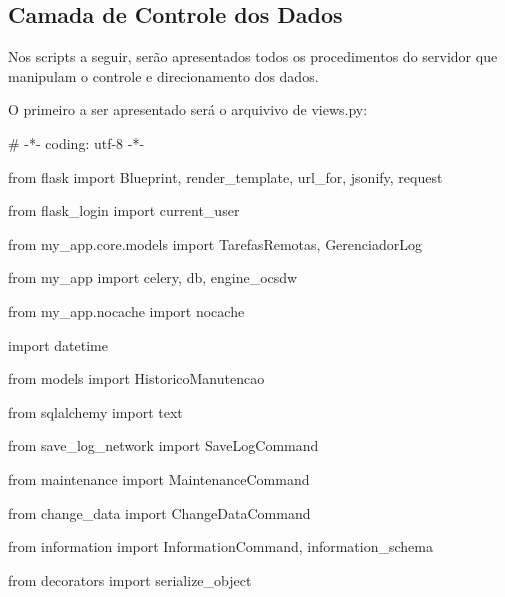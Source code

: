    \bigskip


    \bigskip

    \subsection{Camada de Controle dos Dados}
{\color{black}
    Nos scripts a seguir, ser\~ao apresentados todos os procedimentos do servidor que manipulam o controle e direcionamento
        dos dados.}

{\color{black}
    O primeiro a ser apresentado ser\'a o arquivivo de views.py:}

{\ttfamily\color[rgb]{0.10980392,0.10980392,0.10980392}
    \# -*- coding: utf-8 -*-}


    \bigskip

{\ttfamily\color[rgb]{0.10980392,0.10980392,0.10980392}
    from flask import Blueprint, render\_template, url\_for, jsonify, request}

{\ttfamily\color[rgb]{0.10980392,0.10980392,0.10980392}
    from flask\_login import current\_user}

{\ttfamily\color[rgb]{0.10980392,0.10980392,0.10980392}
    from my\_app.core.models import TarefasRemotas, GerenciadorLog}

{\ttfamily\color[rgb]{0.10980392,0.10980392,0.10980392}
    from my\_app import celery, db, engine\_ocsdw}

{\ttfamily\color[rgb]{0.10980392,0.10980392,0.10980392}
    from my\_app.nocache import nocache}

{\ttfamily\color[rgb]{0.10980392,0.10980392,0.10980392}
    import datetime}

{\ttfamily\color[rgb]{0.10980392,0.10980392,0.10980392}
    from models import HistoricoManutencao}

{\ttfamily\color[rgb]{0.10980392,0.10980392,0.10980392}
    from sqlalchemy import text}

{\ttfamily\color[rgb]{0.10980392,0.10980392,0.10980392}
    from save\_log\_network import SaveLogCommand}

{\ttfamily\color[rgb]{0.10980392,0.10980392,0.10980392}
    from maintenance import MaintenanceCommand}

{\ttfamily\color[rgb]{0.10980392,0.10980392,0.10980392}
    from change\_data import ChangeDataCommand}

{\ttfamily\color[rgb]{0.10980392,0.10980392,0.10980392}
    from information import InformationCommand, information\_schema}

{\ttfamily\color[rgb]{0.10980392,0.10980392,0.10980392}
    from decorators import serialize\_object}

